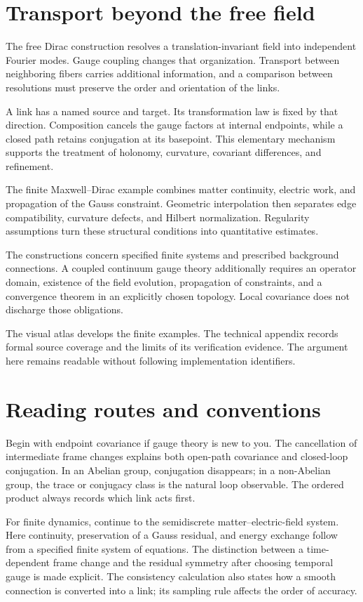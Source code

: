 \section*{Transport beyond the free field}
The free Dirac construction resolves a translation-invariant field into independent Fourier modes. Gauge coupling changes that organization. Transport between neighboring fibers carries additional information, and a comparison between resolutions must preserve the order and orientation of the links.

A link has a named source and target. Its transformation law is fixed by that direction. Composition cancels the gauge factors at internal endpoints, while a closed path retains conjugation at its basepoint. This elementary mechanism supports the treatment of holonomy, curvature, covariant differences, and refinement.

The finite Maxwell--Dirac example combines matter continuity, electric work, and propagation of the Gauss constraint. Geometric interpolation then separates edge compatibility, curvature defects, and Hilbert normalization. Regularity assumptions turn these structural conditions into quantitative estimates.

The constructions concern specified finite systems and prescribed background connections. A coupled continuum gauge theory additionally requires an operator domain, existence of the field evolution, propagation of constraints, and a convergence theorem in an explicitly chosen topology. Local covariance does not discharge those obligations.

The visual atlas develops the finite examples. The technical appendix records formal source coverage and the limits of its verification evidence. The argument here remains readable without following implementation identifiers.

\clearpage
\section*{Reading routes and conventions}
Begin with endpoint covariance if gauge theory is new to you. The cancellation of intermediate frame changes explains both open-path covariance and closed-loop conjugation. In an Abelian group, conjugation disappears; in a non-Abelian group, the trace or conjugacy class is the natural loop observable. The ordered product always records which link acts first.

For finite dynamics, continue to the semidiscrete matter--electric-field system. Here continuity, preservation of a Gauss residual, and energy exchange follow from a specified finite system of equations. The distinction between a time-dependent frame change and the residual symmetry after choosing temporal gauge is made explicit. The consistency calculation also states how a smooth connection is converted into a link; its sampling rule affects the order of accuracy.

